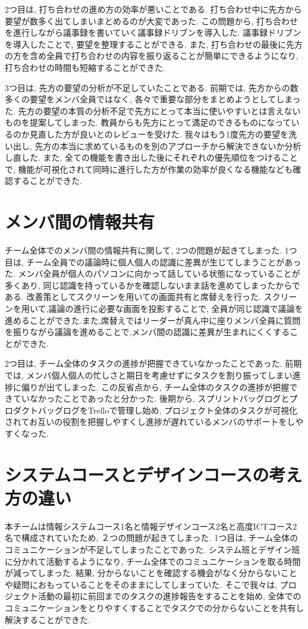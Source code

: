 2つ目は, 打ち合わせの進め方の効率が悪いことである. 打ち合わせ中に先方から要望が数多く出てしまいまとめるのが大変であった. この問題から, 打ち合わせを進行しながら議事録を書いていく議事録ドリブンを導入した.
議事録ドリブンを導入したことで, 要望を整理することができる. また, 打ち合わせの最後に先方の方を含め全員で打ち合わせの内容を振り返ることが簡単にできるようになり, 打ち合わせの時間も短縮することができた.

3つ目は, 先方の要望の分析が不足していたことである.
前期では, 先方からの数多くの要望をメンバ全員ではなく, 各々で重要な部分をまとめようとしてしまった. 先方の要望の本質の分析不足で先方にとって本当に使いやすいとは言えないものを提案してしまった.
教員からも先方にとって満足のできるものになっているのか見直した方が良いとのレビューを受けた. 我々はもう1度先方の要望を洗い出し, 先方の本当に求めているものを別のアプローチから解決できないか分析し直した.
また, 全ての機能を書き出した後にそれぞれの優先順位をつけることで, 機能が可視化されて同時に進行した方が作業の効率が良くなる機能なども確認することができた.
\section{メンバ間の情報共有}
チーム全体でのメンバ間の情報共有に関して, 2つの問題が起きてしまった.
1つ目は, チーム全員での議論時に個人個人の認識に差異が生じてしまうことがあった. メンバ全員が個人のパソコンに向かって話している状態になっていることが多くあり,
同じ認識を持っているかを確認しないまま話を進めてしまったからである. 改善策としてスクリーンを用いての画面共有と席替えを行った. スクリーンを用いて,議論の進行に必要な画面を投影することで,
全員が同じ認識で議論を進めることができた.また,席替えではリーダーが真ん中に座りメンバ全員に質問を振りながら議論を進めることで,メンバ間の認識に差異が生まれにくくすることができた.

2つ目は, チーム全体のタスクの進捗が把握できていなかったことであった. 前期では, メンバ個人個人の忙しさと期日を考慮せずにタスクを割り振ってしまい進捗に偏りが出てしまった.
この反省点から, チーム全体のタスクの進捗が把握できていなかったことであったと分かった. 後期から, スプリントバッグログとプロダクトバッグログをTrelloで管理し始め,
プロジェクト全体のタスクが可視化されてお互いの役割を把握しやすくし進捗が遅れているメンバのサポートをしやすくなった.

\section{システムコースとデザインコースの考え方の違い}
本チームは情報システムコース1名と情報デザインコース2名と高度ICTコース2名で構成されていたため, ２つの問題が起きてしまった.
1つ目は, チーム全体のコミュニケーションが不足してしまったことであった. システム班とデザイン班に分かれて活動するようになり, チーム全体でのコミュニケーションを取る時間が減ってしまった.
結果, 分からないことを確認する機会がなく分からないことや疑問におもっていることをそのままにしてしまっていた. そこで我々は, プロジェクト活動の最初に前回までのタスクの進捗報告をすることを始め,
全体でのコミュニケーションをとりやすくすることでタスクでの分からないことを共有し解決することができた.

